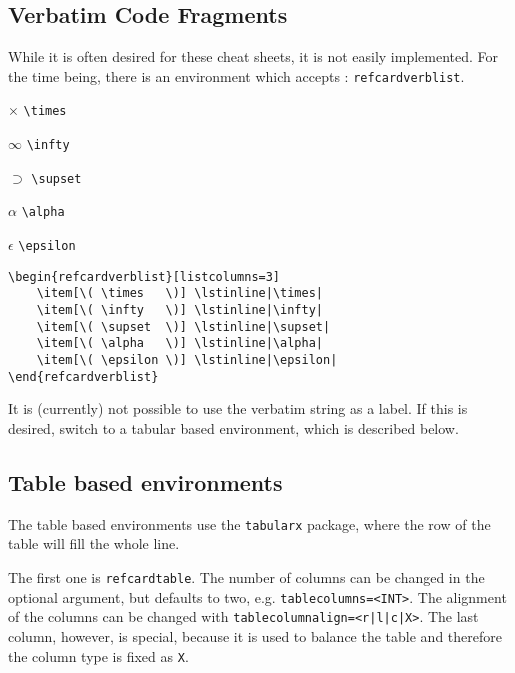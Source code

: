 \documentclass[   %
  final,          %
  a4paper,        %
  columns=3,       %
  margin=1.0cm,   %
]{refcard}
\begin{document}
\subsection{Verbatim Code Fragments}

While it is often desired for these cheat sheets, it is not easily implemented.
For the time being, there is an environment which accepts : 
\lstinline`refcardverblist`.

\begin{refcardverblist}[listcolumns=3]
    \item[\( \times   \)] \lstinline|\times| 
    \item[\( \infty   \)] \lstinline|\infty| 
    \item[\( \supset  \)] \lstinline|\supset|
    \item[\( \alpha   \)] \lstinline|\alpha| 
    \item[\( \epsilon \)] \lstinline|\epsilon|
\end{refcardverblist}

\begin{lstlisting}
\begin{refcardverblist}[listcolumns=3]
    \item[\( \times   \)] \lstinline|\times| 
    \item[\( \infty   \)] \lstinline|\infty| 
    \item[\( \supset  \)] \lstinline|\supset|
    \item[\( \alpha   \)] \lstinline|\alpha| 
    \item[\( \epsilon \)] \lstinline|\epsilon|
\end{refcardverblist}
\end{lstlisting}

It is (currently) not possible to use  the verbatim string as a label.
If this is desired, switch to a tabular based environment, which is described below.

\subsection{Table based environments}

The table based environments use the \lstinline`tabularx` package,
where the row of the table will fill the whole line.

The first one is \lstinline`refcardtable`.
The number of columns can be changed in the optional argument, but defaults to two, 
e.g. \lstinline`tablecolumns=<INT>`. The alignment of the columns can be changed
with \lstinline`tablecolumnalign=<r|l|c|X>`.
The last column, however, is special, because it is used to balance the table and 
therefore the column type is fixed as \lstinline`X`.
\end{document}
